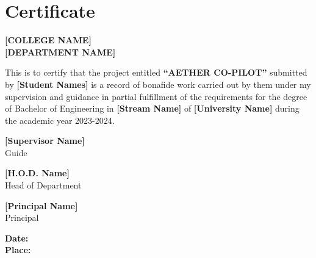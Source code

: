 \chapter*{Certificate}
\thispagestyle{roman}

\begin{center}
    \textbf{\MakeUppercase{[College Name]}} \\
    \textbf{\MakeUppercase{[Department Name]}}
\end{center}

\vspace{1.5cm}

This is to certify that the project entitled \textbf{``AETHER CO-PILOT''} submitted by \textbf{[Student Names]} is a record of bonafide work carried out by them under my supervision and guidance in partial fulfillment of the requirements for the degree of Bachelor of Engineering in \textbf{[Stream Name]} of \textbf{[University Name]} during the academic year 2023-2024.

\vspace{3cm}

\noindent
\begin{minipage}[t]{0.45\textwidth}
    \centering
    \textbf{[Supervisor Name]} \\
    Guide
\end{minipage}
\hfill
\begin{minipage}[t]{0.45\textwidth}
    \centering
    \textbf{[H.O.D. Name]} \\
    Head of Department
\end{minipage}

\vspace{3cm}

\begin{center}
    \textbf{[Principal Name]} \\
    Principal
\end{center}

\vfill

\noindent
\textbf{Date:} \\
\textbf{Place:}
\newpage
